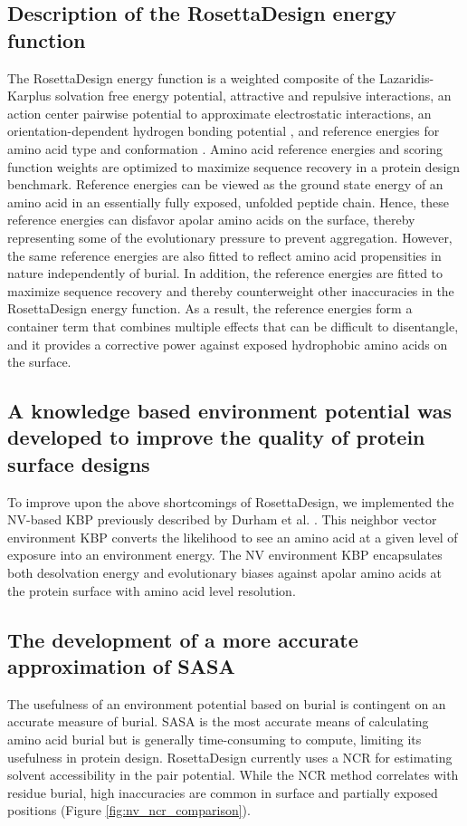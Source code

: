 \subsection{Description of the RosettaDesign energy function}
The RosettaDesign energy function is a weighted composite of the Lazaridis-Karplus solvation free energy potential, attractive and repulsive interactions, an action center pairwise potential to approximate electrostatic interactions, an orientation-dependent hydrogen bonding potential \citep{Kortemme:2003td}, and reference energies for amino acid type and conformation \citep{Dantas:2003vt}. 
Amino acid reference energies and scoring function weights are optimized to maximize sequence recovery in a protein design benchmark.
Reference energies can be viewed as the ground state energy of an amino acid in an essentially fully exposed, unfolded peptide chain.
Hence, these reference energies can disfavor apolar amino acids on the surface, thereby representing some of the evolutionary pressure to prevent aggregation.
However, the same reference energies are also fitted to reflect amino acid propensities in nature independently of burial.
In addition, the reference energies are fitted to maximize sequence recovery and thereby counterweight other inaccuracies in the RosettaDesign energy function.
As a result, the reference energies form a container term that combines multiple effects that can be difficult to disentangle, and it provides a corrective power against exposed hydrophobic amino acids on the surface.

\subsection{A knowledge based environment potential was developed to improve the quality of protein surface designs}
To improve upon the above shortcomings of RosettaDesign, we implemented the \acf{NV}-based \ac{KBP} previously described by Durham et al. \citep{Durham:2009kt}.
This neighbor vector environment \ac{KBP} converts the likelihood to see an amino acid at a given level of exposure into an environment energy.
The \ac{NV} environment \ac{KBP} encapsulates both desolvation energy and evolutionary biases against apolar amino acids at the protein surface with amino acid level resolution.

\subsection{The development of a more accurate approximation of \acs{SASA} }
The usefulness of an environment potential based on burial is contingent on an accurate measure of burial.
\ac{SASA} is the most accurate means of calculating amino acid burial but is generally time-consuming to compute, limiting its usefulness in protein design.
RosettaDesign currently uses a \ac{NCR} for estimating solvent accessibility in the pair potential.
While the \ac{NCR} method correlates with residue burial, high inaccuracies are common in surface and partially exposed positions (Figure \ref{fig:nv_ncr_comparison}). 


